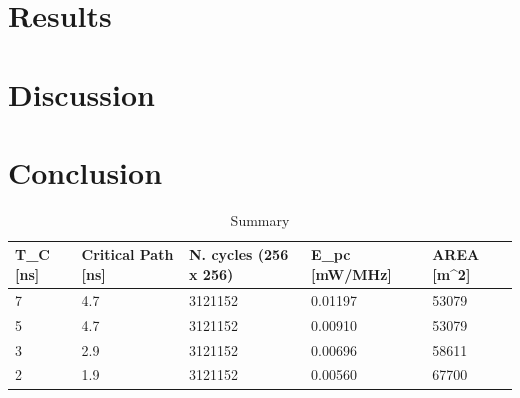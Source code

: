 \documentclass[11pt,a4paper]{article}
\begin{document}
\FloatBarrier
\section{Results}

\section{Discussion}

\section{Conclusion}

\begin{table}[h]
	\caption{Summary}
	\begin{center}
		\begin{tabular}{|p{1cm}|p{2cm}|p{2cm}|l|l|} \hline
			\textbf{T}_C [ns] & \textbf{Critical Path} [ns] & \textbf{N. cycles} (256 x 256) & \textbf{E}_{pc} [mW/MHz] & \textbf{AREA} [\mu m^2] \\ \hline
			7 & 4.7 & 3121152 & 0.01197 & 53079 \\ \hline
			5 & 4.7 & 3121152 & 0.00910 & 53079 \\ \hline
			3 & 2.9 & 3121152 & 0.00696 & 58611 \\ \hline
			2 & 1.9 & 3121152 & 0.00560 & 67700 \\ \hline
		
		\end{tabular}
	\end{center}
	\label{tab:conclusion}
\end{table}
\end{document}
